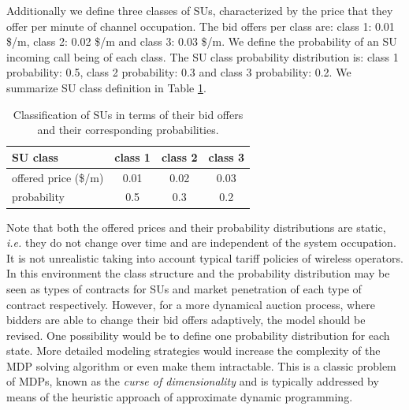 Additionally we define three classes of SUs, characterized by the price that they offer per minute of channel occupation. The bid offers per class are: class 1: 0.01 \$/m, class 2: 0.02 \$/m and class 3: 0.03 \$/m. We define the probability of an SU incoming call being of each class. The SU class probability distribution is: class 1 probability: 0.5, class 2 probability: 0.3 and class 3 probability: 0.2. We summarize SU class definition in Table \ref{tab:table2}.

\begin{table}[h]
\centering
\begin{tabular}{|l|c|c|c|} \hline
 \textbf{SU class} & \textbf{class 1} & \textbf{class 2} & \textbf{class 3}\\\hline
offered price (\$/m) & 0.01 & 0.02 & 0.03\\\hline
probability & 0.5 & 0.3 & 0.2\\\hline
\end{tabular}
\caption{Classification of SUs in terms of their bid offers and their corresponding probabilities.}\label{tab:table2}
\centering
\end{table}
Note that both the offered prices and their probability distributions are static, \textit{i.e.} they do not change over time and are independent of the system occupation. It is not unrealistic taking into account typical tariff policies of wireless operators. In this environment the class structure and the probability distribution may be seen as types of contracts for SUs and market penetration of each type of contract respectively. However, for a more dynamical auction process, where bidders are able to change their bid offers adaptively, the model should be revised. One possibility would be to define one probability distribution for each state. More detailed modeling strategies would increase the complexity of the MDP solving algorithm or even make them intractable. This is a classic problem of MDPs, known as the \textit{curse of dimensionality} and is typically addressed by means of the heuristic approach of approximate dynamic programming.

